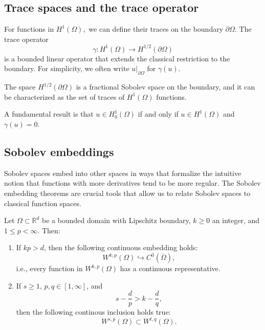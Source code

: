 \subsection{Trace spaces and the trace operator}


For functions in $H^1(\Omega),$ we can define their traces on the boundary $\partial\Omega$. The trace operator 
\[
\gamma: H^1(\Omega) \to H^{1/2}(\partial\Omega)
\]
is a bounded linear operator that extends the classical restriction to the boundary. For simplicity, we often write $u|_{\partial\Omega}$ for $\gamma(u)$.

The space $H^{1/2}(\partial\Omega)$ is a fractional Sobolev space on the boundary, and it can be characterized as the set of traces of $H^1(\Omega)$ functions.

A fundamental result is that $u \in H_0^1(\Omega)$ if and only if $u \in H^1(\Omega)$ and $\gamma(u) = 0$.

\subsection{Sobolev embeddings}

Sobolev spaces embed into other spaces in ways that formalize the intuitive notion that functions with more derivatives tend to be more regular. The Sobolev embedding theorems are crucial tools that allow us to relate Sobolev spaces to classical function spaces.

\begin{theorem}
Let $\Omega \subset \mathbb{R}^d$ be a bounded domain with Lipschitz boundary, $k \geq 0$ an integer, and $1 \leq p < \infty$. Then:

\begin{enumerate}
  \item If $kp > d$, then the following continuous embedding holds:
  \[
  W^{k,p}(\Omega) \hookrightarrow C^{0}(\overline{\Omega}),
  \]
  i.e., every function in $W^{k,p}(\Omega)$ has a continuous representative.
  
  \item If $s \geq 1$, $p,q \in [1, \infty]$, and 
  \[
  s - \frac{d}{p} > k - \frac{d}{q},
  \]
  then the following continous inclusion holds true:
  \[ 
    W^{s,p}(\Omega) \subset W^{t,q}(\Omega).
  \]
\end{enumerate}
\end{theorem}

